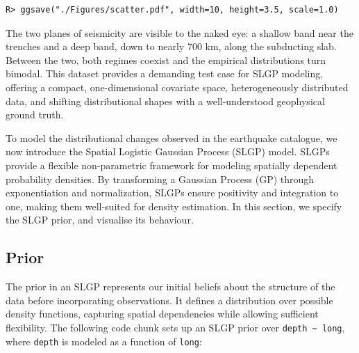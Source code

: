 \documentclass[
]{article}
\begin{document}
\begin{verbatim}
R> ggsave("./Figures/scatter.pdf", width=10, height=3.5, scale=1.0)
\end{verbatim}

The two planes of seismicity are visible to the naked eye: a shallow band near the trenches and a deep band, down to nearly 700 km, along the subducting slab. Between the two, both regimes coexist and the empirical distributions turn bimodal. This dataset provides a demanding test case for SLGP modeling, offering a compact, one-dimensional covariate space, heterogeneously distributed data, and shifting distributional shapes with a well-understood geophysical ground truth.

To model the distributional changes observed in the earthquake catalogue, we now introduce the Spatial Logistic Gaussian Process (SLGP) model. SLGPs provide a flexible non-parametric framework for modeling spatially dependent probability densities. By transforming a Gaussian Process (GP) through exponentiation and normalization, SLGPs ensure positivity and integration to one, making them well-suited for density estimation.
In this section, we specify the SLGP prior, and visualise its behaviour.

\subsection{Prior}\label{prior}

The prior in an SLGP represents our initial beliefs about the structure of the data before incorporating observations. It defines a distribution over possible density functions, capturing spatial dependencies while allowing sufficient flexibility.
The following code chunk sets up an SLGP prior over \texttt{depth\ \textasciitilde{}\ long}, where \texttt{depth} is modeled as a function of \texttt{long}:
\end{document}
